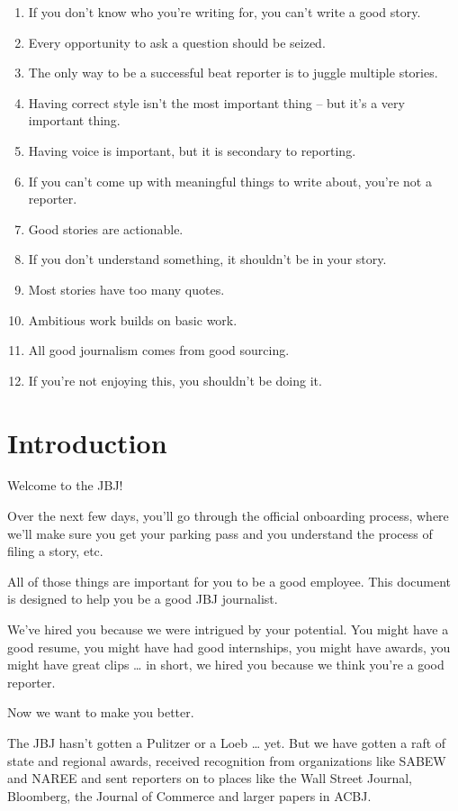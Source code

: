 \documentclass[
  11pt,
  american,
  letterpaperpaper,
  extrafontsizes,onecolumn,openright
  ]{memoir}
\providecommand{\tightlist}{%
  \setlength{\itemsep}{0pt}\setlength{\parskip}{0pt}}
\begin{document}
\begin{enumerate}
\def\labelenumi{\arabic{enumi}.}
\tightlist
\item
  If you don't know who you're writing for, you can't write a good story.
\item
  Every opportunity to ask a question should be seized.
\item
  The only way to be a successful beat reporter is to juggle multiple stories.
\item
  Having correct style isn't the most important thing -- but it's a very important thing.
\item
  Having voice is important, but it is secondary to reporting.
\item
  If you can't come up with meaningful things to write about, you're not a reporter.
\item
  Good stories are actionable.
\item
  If you don't understand something, it shouldn't be in your story.
\item
  Most stories have too many quotes.
\item
  Ambitious work builds on basic work.
\item
  All good journalism comes from good sourcing.
\item
  If you're not enjoying this, you shouldn't be doing it.
\end{enumerate}

\hypertarget{introduction}{%
\chapter*{Introduction}\label{introduction}}

Welcome to the JBJ!

Over the next few days, you'll go through the official onboarding process, where we'll make sure you get your parking pass and you understand the process of filing a story, etc.

All of those things are important for you to be a good employee. This document is designed to help you be a good JBJ journalist.

We've hired you because we were intrigued by your potential. You might have a good resume, you might have had good internships, you might have awards, you might have great clips \ldots{} in short, we hired you because we think you're a good reporter.

Now we want to make you better.

The JBJ hasn't gotten a Pulitzer or a Loeb \ldots{} yet. But we have gotten a raft of state and regional awards, received recognition from organizations like SABEW and NAREE and sent reporters on to places like the Wall Street Journal, Bloomberg, the Journal of Commerce and larger papers in ACBJ.
\end{document}
